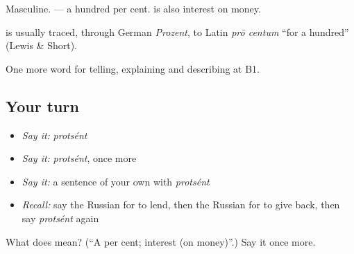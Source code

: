 Masculine. \emph{ } — a hundred per cent. \emph{} is also interest on money.

\begin{cousinweb}
\textbf{} is usually traced, through German \emph{Prozent}, to Latin \emph{prō centum} \textquotedblleft{}for a hundred\textquotedblright{} (Lewis \& Short).
\end{cousinweb}

\begin{grammarlens}[title={What you've built}]
One more word for telling, explaining and describing at B1.
\end{grammarlens}

\subsection*{Your turn}
\begin{itemize}
\raggedright
  \item \emph{Say it:} \emph{protsént}
  \item \emph{Say it:} \emph{protsént}, once more
  \item \emph{Say it:} a sentence of your own with \emph{protsént}
  \item \emph{Recall:} say the Russian for to lend, then the Russian for to give back, then say \emph{protsént} again
\end{itemize}

\begin{tcolorbox}[breakable,colback=teal!4,colframe=teal!35!black,title={Before you move on}]
What does  mean? (\textquotedblleft{}A per cent; interest (on money)\textquotedblright{}.) Say it once more.
\end{tcolorbox}
